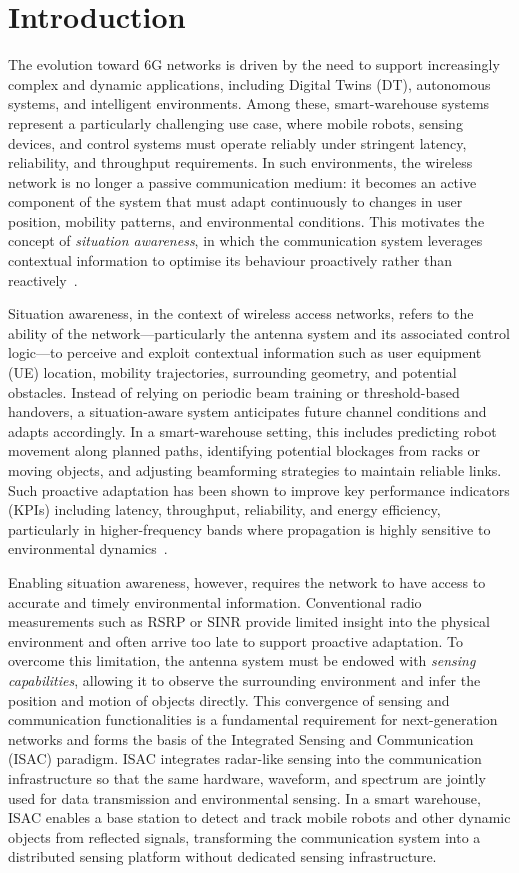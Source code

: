 \section{Introduction}
\label{sec:introduction}

The evolution toward 6G networks is driven by the need to support increasingly
complex and dynamic applications, including Digital Twins (DT), autonomous
systems, and intelligent environments. Among these, smart-warehouse systems
represent a particularly challenging use case, where mobile robots, sensing
devices, and control systems must operate reliably under stringent latency,
reliability, and throughput requirements. In such environments, the wireless
network is no longer a passive communication medium: it becomes an active
component of the system that must adapt continuously to changes in user
position, mobility patterns, and environmental conditions. This motivates the
concept of \emph{situation awareness}, in which the communication system
leverages contextual information to optimise its behaviour proactively rather
than reactively~\cite{ref:positioning_6g}.

Situation awareness, in the context of wireless access networks, refers to the
ability of the network---particularly the antenna system and its associated
control logic---to perceive and exploit contextual information such as user
equipment (UE) location, mobility trajectories, surrounding geometry, and
potential obstacles. Instead of relying on periodic beam training or
threshold-based handovers, a situation-aware system anticipates future channel
conditions and adapts accordingly. In a smart-warehouse setting, this
includes predicting robot movement along planned paths, identifying potential
blockages from racks or moving objects, and adjusting beamforming strategies
to maintain reliable links. Such proactive adaptation has been shown to
improve key performance indicators (KPIs) including latency, throughput,
reliability, and energy efficiency, particularly in higher-frequency bands
where propagation is highly sensitive to environmental
dynamics~\cite{ref:multimodal_bf,ref:predictive_handover}.

Enabling situation awareness, however, requires the network to have access to
accurate and timely environmental information. Conventional radio measurements
such as RSRP or SINR provide limited insight into the physical environment and
often arrive too late to support proactive adaptation. To overcome this
limitation, the antenna system must be endowed with \emph{sensing
capabilities}, allowing it to observe the surrounding environment and infer
the position and motion of objects directly. This convergence of sensing and
communication functionalities is a fundamental requirement for next-generation
networks and forms the basis of the Integrated Sensing and Communication
(ISAC) paradigm. ISAC integrates radar-like sensing into the communication
infrastructure so that the same hardware, waveform, and spectrum are jointly
used for data transmission and environmental sensing. In a smart warehouse,
ISAC enables a base station to detect and track mobile robots and other
dynamic objects from reflected signals, transforming the communication system
into a distributed sensing platform without dedicated sensing infrastructure.

